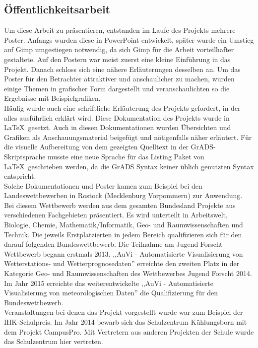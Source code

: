 \subsection{Öffentlichkeitsarbeit} %
Um diese Arbeit zu präsentieren, entstanden im Laufe des Projekts mehrere Poster.
Anfangs wurden diese in PowerPoint entwickelt, später wurde ein Umstieg
auf Gimp umgestiegen notwendig,
da sich Gimp für die Arbeit vorteilhafter gestaltete.
Auf den Postern war meist zuerst eine kleine Einführung in das Projekt.
Danach schloss sich eine nähere Erläuterungen desselben an.
Um das Poster für den Betrachter attraktiver und anschaulicher zu machen,
wurden einige Themen in grafischer Form dargestellt und
veranschaulichten so die Ergebnisse mit Beispielgrafiken. \\
Häufig wurde auch eine schriftliche Erläuterung des Projekts gefordert,
in der alles ausführlich erklärt wird.
Diese Dokumentation des Projekts wurde in \LaTeX\ gesetzt.
Auch in diesen Dokumentationen wurden Übersichten und Grafiken als Anschauungsmaterial
beigefügt und nötigenfalls näher erläutert. Für die visuelle Aufbereitung von
dem gezeigten Quelltext in der GrADS-Skriptsprache musste eine neue Sprache für das
Listing Paket von \LaTeX\ geschrieben werden, da die GrADS Syntax keiner üblich genutzten
Syntax entspricht.\\
Solche Dokumentationen und Poster kamen zum Beispiel bei
den Landeswettbewerben \jf in Rostock (Mecklenburg Vorpommern) zur Anwendung.
Bei diesem Wettbewerb werden aus dem gesamten
Bundesland Projekte aus verschiedenen Fachgebieten präsentiert.
Es wird unterteilt in Arbeitswelt, Biologie, Chemie,
Mathematik/Informatik, Geo- und Raumwissenschaften und Technik.
Die jeweils Erstplatzierten in jedem Bereich
qualifizieren sich für den darauf folgenden Bundeswettbewerb.
Die Teilnahme am Jugend Forscht Wettbewerb begann erstmals 2013.
,,AuVi - Automatisierte Visualisierung von Wetterstations- und Wetterprognosedaten''
erreichte den zweiten Platz in der Kategorie Geo- und Raumwissenschaften des Wettbewerbes
Jugend Forscht 2014.
Im Jahr 2015 erreichte das weiterentwickelte
,,AuVi - Automatisierte Visualisierung von meteorologischen Daten''
die Qualifizierung für den Bundeswettbewerb.\\
Veranstaltungen bei denen das Projekt vorgestellt wurde war zum Beispiel der IHK-Schulpreis.
Im Jahr 2014 bewarb sich das Schulzentrum Kühlungsborn mit dem Projekt CampusPro.
Mit Vertretern aus anderen Projekten der Schule wurde das Schulzentrum hier vertreten.

